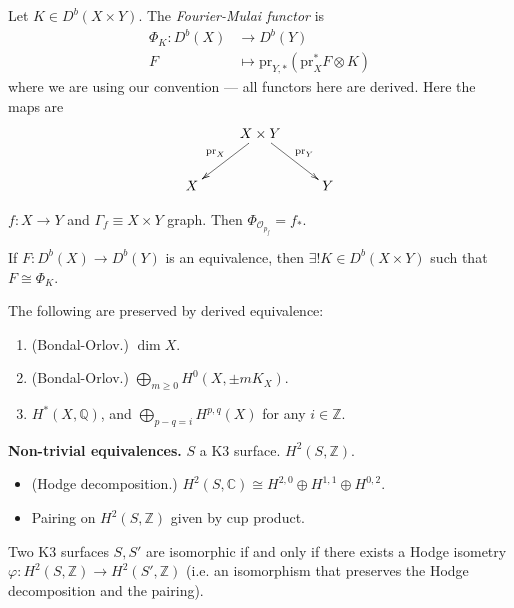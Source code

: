 \begin{definition}
\label{definition-}
Let $K \in D^b(X \times Y)$. The {\it
Fourier-Mulai functor} is
$$
\begin{aligned}
\Phi_K: D^b(X) &\longrightarrow D^b(Y) \\
F &\longmapsto \text{pr}_{Y,*}(\text{pr}_X^*F
\otimes K)
\end{aligned}
$$
where we are using our convention --- all
functors here are derived. Here the maps are
$$
\xymatrix{
& X \times
Y\ar[dl]_{\text{pr}_X}\ar[dr]^{\text{pr}_Y}\\
X& & Y
}
$$
\end{definition}

\begin{example}
\label{example-Fourier-Mukai}
$f:X \to Y$ and $\Gamma_f \equiv X \times Y$
graph. Then $\Phi_{\mathcal{O}_{p_f}}=f_*$.
\end{example}

\begin{theorem}[Orlov]
\label{theorem-Orlov}
If $F:D^b(X) \to D^b(Y)$ is an equivalence,
then $\exists ! K \in D^b(X \times Y)$ such
that $F \cong \Phi_K$.
\end{theorem}

\begin{theorem}
\label{nasak-label-002}
The following are preserved by derived
equivalence:
\begin{enumerate}
\item (Bondal-Orlov.) $\dim X$.
\item (Bondal-Orlov.) $\bigoplus_{m \geq
0}H^{0}(X,\pm m K_X)$.
\item $H^{*}(X,\mathbb{Q})$, and
$\bigoplus_{p-q=i}H^{p,q}(X)$ for any $i \in
\mathbb{Z}$.
\end{enumerate}
\end{theorem}

\medskip\noindent
{\bf Non-trivial equivalences.} $S$ a K3
surface. $H^{2}(S,\mathbb{Z})$.
\begin{itemize}
\item (Hodge decomposition.)
$H^{2}(S,\mathbb{C})\cong H^{2,0} \oplus
H^{1,1} \oplus H^{0,2}$.
\item Pairing on $H^{2}(S,\mathbb{Z})$ given
by cup product.
\end{itemize}

\begin{theorem}
\label{theorem-Torelli-for-K3}
Two K3 surfaces $S,S'$ are isomorphic if and
only if there exists a Hodge isometry
$\varphi:H^{2}(S,\mathbb{Z})\to
H^{2}(S',\mathbb{Z})$ (i.e. an isomorphism
that preserves the Hodge decomposition and
the pairing).
\end{theorem}

